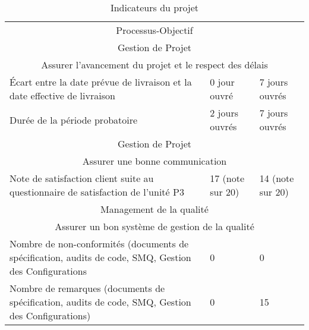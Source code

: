 \documentclass[asi]{picInsa}
\begin{document}
\begin{table}
\begin{tabular}[H]{|p{}|p{}|p{}|}
	\hline
	\rowcolor[gray]{0.85}
	\multicolumn{3}{|c|}{\cellcolor[gray]{0.65} Indicateurs ponctuels} \\\hline 
	\multicolumn{3}{|c|}{Processus-Objectif} \\\hline
	\multicolumn{3}{|c|}{\cellcolor[gray]{0.85} Gestion de Projet} \\
	\multicolumn{3}{|c|}{\cellcolor[gray]{0.85} Assurer l'avancement du projet et le respect des délais} \\\hline
	Écart entre la date prévue de livraison et la date effective de livraison & 0 jour ouvré & 7 jours ouvrés  \\\hline
	Durée de la période probatoire & 2 jours ouvrés & 7 jours ouvrés \\\hline
	\multicolumn{3}{|c|}{\cellcolor[gray]{0.85} Gestion de Projet} \\
	\multicolumn{3}{|c|}{\cellcolor[gray]{0.85} Assurer une bonne communication} \\\hline
	Note de satisfaction client suite au questionnaire de satisfaction de l'unité P3 & 17 (note sur 20) & 14 (note sur 20) \\\hline
	\multicolumn{3}{|c|}{\cellcolor[gray]{0.85} Management de la qualité} \\
	\multicolumn{3}{|c|}{\cellcolor[gray]{0.85} Assurer un bon système de gestion de la qualité} \\\hline
	Nombre de non-conformités (documents de spécification, audits de code, SMQ, Gestion des Configurations & 0 & 0 \\\hline
	Nombre de remarques (documents de spécification, audits de code, SMQ, Gestion des Configurations) & 0 & 15 \\\hline
	
\end{tabular}

\caption{Indicateurs du projet \nomEquipe{}} \label{indicateurs}
\end{table}
\end{document}
